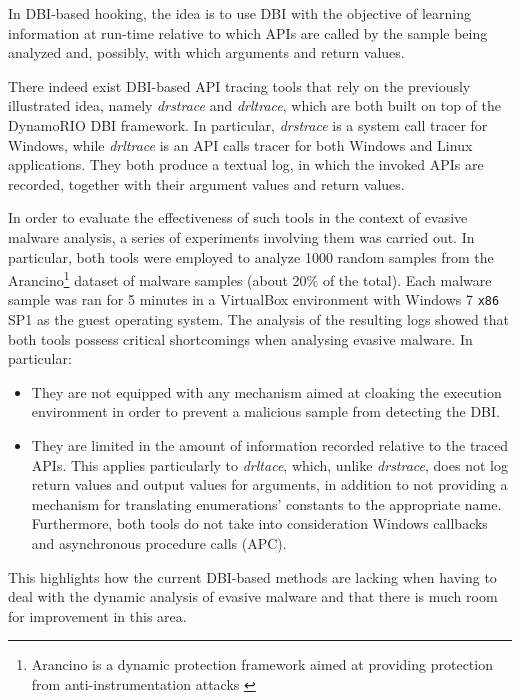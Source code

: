 In DBI-based hooking, the idea is to use DBI with the objective of learning information at run-time relative to which APIs are called by the sample being analyzed and, possibly, with which arguments and return values. 

There indeed exist DBI-based API tracing tools that rely on the previously illustrated idea, namely \textit{drstrace} and \textit{drltrace}, which are both built on top of the DynamoRIO \cite{DynamoRIO} DBI framework. In particular, \textit{drstrace} is a system call tracer for Windows, while \textit{drltrace} is an API calls tracer for both Windows and Linux applications. They both produce a textual log, in which the invoked APIs are recorded, together with their argument values and return values.

In order to evaluate the effectiveness of such tools in the context of evasive malware analysis, a series of experiments involving them was carried out. In particular, both tools were employed to analyze 1000 random samples from the Arancino\footnote{Arancino is a dynamic protection framework aimed at providing protection from anti-instrumentation attacks \cite{polino_arancino_2017}} dataset of malware samples (about 20\% of the total). Each malware sample was ran for 5 minutes in a VirtualBox environment with Windows 7 \texttt{x86} SP1 as the guest operating system. The analysis of the resulting logs showed that both tools possess critical shortcomings when analysing evasive malware. In particular: 

\begin{itemize}
\item They are not equipped with any mechanism aimed at cloaking the execution environment in order to prevent a malicious sample from detecting the DBI.
\item They are limited in the amount of information recorded relative to the traced APIs. This applies particularly to \textit{drltace}, which, unlike \textit{drstrace}, does not log return values and output values for arguments, in addition to not providing a mechanism for translating enumerations' constants to the appropriate name. Furthermore, both tools do not take into consideration Windows callbacks and asynchronous procedure calls (APC).
\end{itemize}

This highlights how the current DBI-based methods are lacking when having to deal with the dynamic analysis of evasive malware and that there is much room for improvement in this area.

